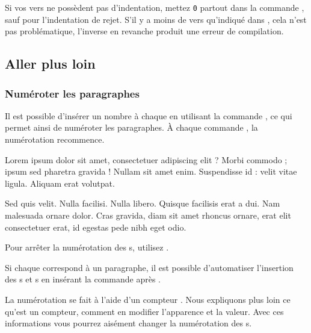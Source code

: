 Si vos vers ne possèdent pas d'indentation, mettez \verb=0= partout dans la commande , sauf pour l'indentation de rejet. S'il y a moins de vers qu'indiqué dans , cela n'est pas problématique, l'inverse en revanche produit une erreur de compilation.



\subsection{Aller plus loin}

\subsubsection{Numéroter les paragraphes}

Il est possible d'insérer un nombre à chaque  en utilisant la commande \label{numberpstarttrue}, ce qui permet ainsi de numéroter les paragraphes. À chaque commande , la numérotation recommence.

\begin{minipage}{0.8\textwidth}
\numberpstarttrue
\beginnumbering
\pstart 
Lorem ipsum dolor sit amet, consectetuer adipiscing elit ?
Morbi commodo ; ipsum sed pharetra gravida !
Nullam sit amet enim. Suspendisse id : velit vitae ligula. 
Aliquam erat volutpat. \pend


\pstart Sed quis velit. Nulla facilisi. Nulla libero. 
 Quisque facilisis erat a dui.
Nam malesuada ornare dolor.
Cras gravida, diam sit amet rhoncus ornare, 
erat  elit consectetuer erat, id egestas pede nibh eget odio.
\pend
\endnumbering
\end{minipage}

Pour arrêter la numérotation des s,  utilisez  .

\begin{plusloins}
\label{autopar}Si chaque  correspond à un paragraphe, il est possible d'automatiser l'insertion des s et s en insérant la commande  après .
\end{plusloins}

\begin{plusloins}
La numérotation se fait à l'aide d'un compteur . Nous expliquons plus loin ce qu'est un compteur, comment en modifier l'apparence et la valeur. Avec ces informations vous pourrez aisément changer la numérotation des s.
\end{plusloins}

